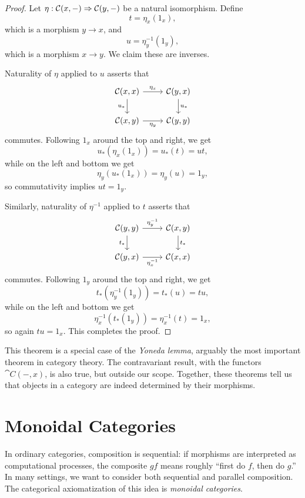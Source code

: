 \begin{proof}
  Let $\eta: {\mathcal{C}}(x, -)\Rightarrow{\mathcal{C}}(y, -)$ be a natural isomorphism. Define \[
    t = \eta_x(1_x),
    \] which is a morphism $y\to x$, and \[
    u = \eta_y^{-1}(1_y),
  \]
  which is a morphism $x\to y$. We claim these are inverses.

  Naturality of $\eta$ applied to $u$ asserts that \[
    \begin{tikzcd}
      \cat{C}(x, x)\ar[r, "\eta_x"]\ar[d, "u_*"'] & \cat{C}(y, x)\ar[d, "u_*"] \\
      \cat{C}(x, y)\ar[r, "\eta_y"'] & \cat{C}(y, y)
    \end{tikzcd}
  \]
  commutes. Following $1_x$ around the top and right, we get \[
    u_*(\eta_x(1_x)) = u_*(t) = ut,
  \] while on the left and bottom we get \[
    \eta_y(u_*(1_x)) = \eta_y(u) = 1_y,
  \]
  so commutativity implies $ut = 1_y$.

  Similarly, naturality of $\eta^{-1}$ applied to $t$ asserts that \[
    \begin{tikzcd}
      \cat{C}(y, y)\ar[r, "\eta_y^{-1}"]\ar[d, "t_*"'] & \cat{C}(x, y)\ar[d, "t_*"] \\
      \cat{C}(y, x)\ar[r, "\eta_x^{-1}"'] & \cat{C}(x, x)
    \end{tikzcd}
  \]
  commutes. Following $1_y$ around the top and right, we get \[
    t_*(\eta_y^{-1}(1_y)) = t_*(u) = tu,
  \] while on the left and bottom we get \[
    \eta_x^{-1}(t_*(1_y)) = \eta_x^{-1}(t) = 1_x,
  \]
  so again $tu = 1_x$. This completes the proof.
\end{proof}

This theorem is a special case of the \emph{Yoneda lemma}, arguably the most
important theorem in category theory. The contravariant result, with the
functors $\cat{C}(-, x)$, is also true, but outside our scope. Together, these
theorems tell us that objects in a category are indeed determined by their
morphisms.


\section{Monoidal Categories}

In ordinary categories, composition is sequential: if morphisms are interpreted
as computational processes, the composite $gf$ means roughly ``first do $f$,
then do $g$.'' In many settings, we want to consider both sequential and
parallel composition. The categorical axiomatization of this idea is
\emph{monoidal categories}.


